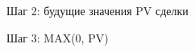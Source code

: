 \documentclass{beamer}
\begin{document}
\begin{frame}{Шаг 2: будущие значения PV сделки}
\begin{figure}
\centering
\end{figure}
\end{frame}



\begin{frame}{Шаг 3: MAX(0, PV)}
\begin{figure}
\centering
\end{figure}
\end{frame}
\end{document}
